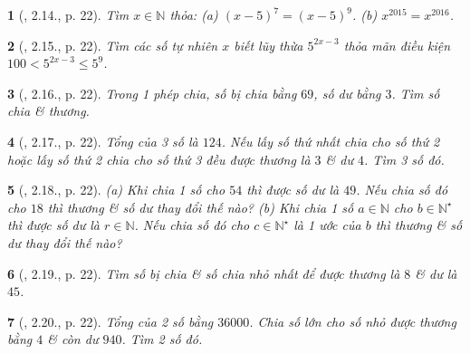 \documentclass{article}
\newtheorem{baitoan}{}
\begin{document}
\begin{baitoan}[\cite{Binh_boi_duong_Toan_6_tap_1}, 2.14., p. 22]
	Tìm $x\in\mathbb{N}$ thỏa: (a) $(x - 5)^7 = (x - 5)^9$. (b) $x^{2015} = x^{2016}$.
\end{baitoan}

\begin{baitoan}[\cite{Binh_boi_duong_Toan_6_tap_1}, 2.15., p. 22]
	Tìm các số tự nhiên $x$ biết lũy thừa $5^{2x - 3}$ thỏa mãn điều kiện $100 < 5^{2x - 3}\le5^9$.
\end{baitoan}

\begin{baitoan}[\cite{Binh_boi_duong_Toan_6_tap_1}, 2.16., p. 22]
	Trong 1 phép chia, số bị chia bằng $69$, số dư bằng $3$. Tìm số chia \& thương.
\end{baitoan}

\begin{baitoan}[\cite{Binh_boi_duong_Toan_6_tap_1}, 2.17., p. 22]
	Tổng của 3 số là $124$. Nếu lấy số thứ nhất chia cho số thứ 2 hoặc lấy số thứ 2 chia cho số thứ 3 đều được thương là $3$ \& dư $4$. Tìm 3 số đó.
\end{baitoan}

\begin{baitoan}[\cite{Binh_boi_duong_Toan_6_tap_1}, 2.18., p. 22]
	(a) Khi chia 1 số cho $54$ thì được số dư là $49$. Nếu chia số đó cho $18$ thì thương \& số dư thay đổi thế nào? (b) Khi chia 1 số $a\in\mathbb{N}$ cho $b\in\mathbb{N}^\star$ thì được số dư là $r\in\mathbb{N}$. Nếu chia số đó cho $c\in\mathbb{N}^\star$ là 1 ước của $b$ thì thương \& số dư thay đổi thế nào?
\end{baitoan}

\begin{baitoan}[\cite{Binh_boi_duong_Toan_6_tap_1}, 2.19., p. 22]
	Tìm số bị chia \& số chia nhỏ nhất để được thương là $8$ \& dư là $45$.
\end{baitoan}

\begin{baitoan}[\cite{Binh_boi_duong_Toan_6_tap_1}, 2.20., p. 22]
	Tổng của 2 số bằng $36000$. Chia số lớn cho số nhỏ được thương bằng $4$ \& còn dư $940$. Tìm 2 số đó.
\end{baitoan}
\end{document}
